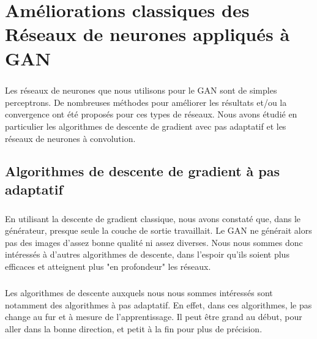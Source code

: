 

\chapter{Améliorations classiques des Réseaux de neurones appliqués à GAN}


\paragraph{}
Les réseaux de neurones que nous utilisons pour le GAN sont de simples perceptrons. De nombreuses méthodes pour améliorer les résultats et/ou la convergence ont été proposés pour ces types de réseaux. Nous avons étudié en particulier les algorithmes de descente de gradient avec pas adaptatif et les réseaux de neurones à convolution. 

\section{Algorithmes de descente de gradient à pas adaptatif}
\paragraph{}
En utilisant la descente de gradient classique, nous avons constaté que, dans le générateur, presque seule la couche de sortie travaillait. Le GAN ne générait alors pas des images d'assez bonne qualité ni assez diverses. Nous nous sommes donc intéressés à d'autres algorithmes de descente, dans l'espoir qu'ils soient plus efficaces et atteignent plus "en profondeur" les réseaux. 
\paragraph{}
Les algorithmes de descente auxquels nous nous sommes intéressés sont notamment des algorithmes à pas adaptatif. En effet, dans ces algorithmes, le pas change au fur et à mesure de l'apprentissage. Il peut être grand au début, pour aller dans la bonne direction, et petit à la fin pour plus de précision. 

